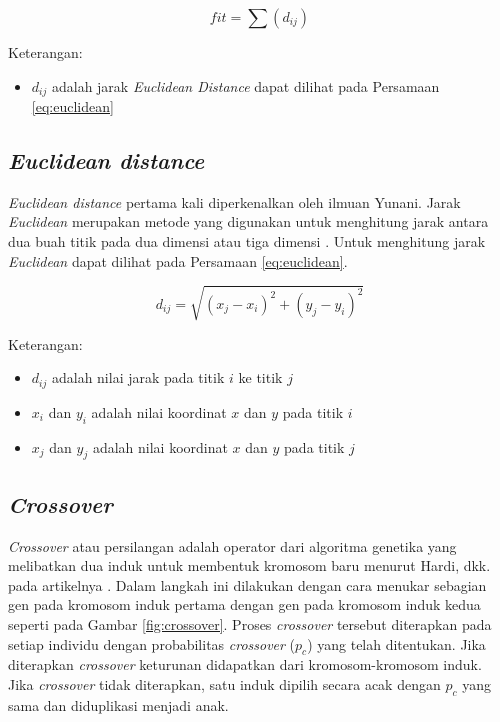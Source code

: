 	\begin{equation}
    fit=\sum (d_{ij})
    \label{eq:fitness}
    \end{equation}
    
    Keterangan:
    \begin{itemize}
	\item $d_{ij}$ adalah jarak \textit{Euclidean Distance} dapat dilihat pada Persamaan \ref{eq:euclidean}
    \end{itemize}
	
\subsection{\textit{Euclidean distance}}

\textit{Euclidean distance} pertama kali diperkenalkan oleh ilmuan Yunani. Jarak \textit{Euclidean} merupakan metode yang digunakan untuk menghitung jarak antara dua buah titik pada dua dimensi atau tiga dimensi \cite{widodo2018penerapan}. Untuk menghitung jarak \textit{Euclidean} dapat dilihat pada Persamaan \ref{eq:euclidean}.
       
    \begin{equation}
	d_{ij}=\sqrt{\left( x_j-x_i \right)^{2}+\left( y_j-y_i \right)^{2}}
	\label{eq:euclidean}
	\end{equation}
	
	Keterangan:
	\begin{itemize}
	\item $d_{ij}$ adalah nilai jarak pada titik $i$ ke titik $j$
	\item $x_i$ dan $y_i$ adalah nilai koordinat $x$ dan $y$ pada titik $i$
	\item $x_j$ dan $y_j$ adalah nilai koordinat $x$ dan $y$ pada titik $j$
	\end{itemize}

\subsection{\textit{Crossover}}
\textit{Crossover} atau persilangan adalah operator dari algoritma genetika yang melibatkan dua induk untuk membentuk kromosom baru menurut Hardi, dkk. pada artikelnya \cite{hardi2014analisis}. Dalam langkah ini dilakukan dengan cara menukar sebagian gen pada kromosom induk pertama dengan gen pada kromosom induk kedua seperti pada Gambar \ref{fig:crossover}. Proses \textit{crossover} tersebut diterapkan pada setiap individu dengan probabilitas \textit{crossover} ($p_c$) yang telah ditentukan. Jika diterapkan \textit{crossover} keturunan didapatkan dari kromosom-kromosom induk. Jika \textit{crossover} tidak diterapkan, satu induk dipilih secara acak dengan $p_c$ yang sama dan diduplikasi menjadi anak.

